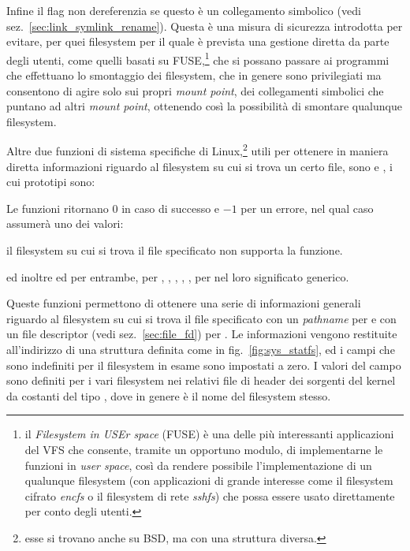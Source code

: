 Infine il flag  non dereferenzia  se
questo è un collegamento simbolico (vedi
sez.~\ref{sec:link_symlink_rename}). Questa è una misura di sicurezza
introdotta per evitare, per quei filesystem per il quale è prevista una
gestione diretta da parte degli utenti, come quelli basati su 
FUSE,\footnote{il \textit{Filesystem in USEr space} (FUSE) è una delle più
  interessanti applicazioni del VFS che consente, tramite un opportuno modulo,
  di implementarne le funzioni in \textit{user space}, così da rendere
  possibile l'implementazione di un qualunque filesystem (con applicazioni di
  grande interesse come il filesystem cifrato \textit{encfs} o il filesystem
  di rete \textit{sshfs}) che possa essere usato direttamente per conto degli
  utenti.}  che si possano passare ai programmi che effettuano lo smontaggio
dei filesystem, che in genere sono privilegiati ma consentono di agire solo
sui propri \textit{mount point}, dei collegamenti simbolici che puntano ad
altri \textit{mount point}, ottenendo così la possibilità di smontare
qualunque filesystem.


Altre due funzioni di sistema specifiche di Linux,\footnote{esse si trovano
  anche su BSD, ma con una struttura diversa.} utili per ottenere in maniera
diretta informazioni riguardo al filesystem su cui si trova un certo file,
sono  e , i cui prototipi sono:

\begin{funcproto}{
}
{Le funzioni ritornano $0$ in caso di successo e $-1$ per un errore,
  nel qual caso  assumerà uno dei valori: 
  \begin{errlist}
  \item[\errcode{ENOSYS}] il filesystem su cui si trova il file specificato
    non supporta la funzione.
  \end{errlist} ed inoltre  ed  per entrambe,
   per , , ,
  , ,  per  nel loro
  significato generico.}
\end{funcproto}

Queste funzioni permettono di ottenere una serie di informazioni generali
riguardo al filesystem su cui si trova il file specificato con un
\textit{pathname} per  e con un file descriptor (vedi
sez.~\ref{sec:file_fd}) per .  Le informazioni vengono restituite
all'indirizzo  di una struttura  definita come in
fig.~\ref{fig:sys_statfs}, ed i campi che sono indefiniti per il filesystem in
esame sono impostati a zero.  I valori del campo  sono definiti
per i vari filesystem nei relativi file di header dei sorgenti del kernel da
costanti del tipo , dove  in genere è il nome
del filesystem stesso.

